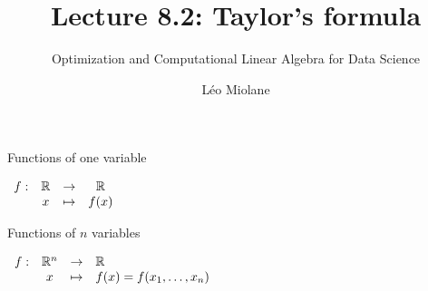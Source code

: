\documentclass{beamer}
\title{Lecture 8.2: Taylor's formula}
\subtitle{Optimization and Computational Linear Algebra for Data Science}
\author{Léo Miolane}
\date{}
\begin{document}
\setcounter{showProgressBar}{0}
\setcounter{showSlideNumbers}{0}

\frame{\titlepage}
\setcounter{framenumber}{0}
\setcounter{showSlideNumbers}{1}


\begin{frame}[t]{Functions of one variable}
	\grid 

			$\displaystyle
			\begin{array}{cccc}
				f: & \mathbb{R} & \to & \mathbb{R} \\
				   & x & \mapsto & f(x)
			\end{array}
			$

\end{frame}
\begin{frame}[t]{Functions of $n$ variables}
	\grid 

			$\displaystyle
			\begin{array}{cccl}
				f: & \mathbb{R}^n & \to & \mathbb{R} \\
				   & x & \mapsto & f(x) = f(x_1, \dots, x_n)
			\end{array}
			$

\end{frame}
\end{document}
